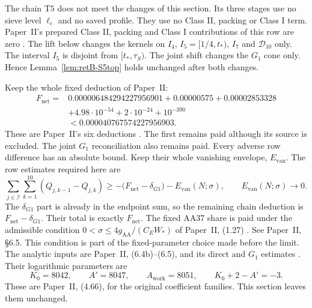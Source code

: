 The chain $\mathrm{T5}$ does not meet the changes of this section. Its
three stages use no sieve level $\ell_c$ and no saved profile. They use no
Class II, packing or Class I term. Paper~II's prepared Class II, packing and Class I
contributions of this row are zero \cite[\S2.4, paragraph ``S5-top and S6
use BV separately'']{PaperII}. The lift below changes the kernels on $I_4$,
$I_5=[1/4,t_*)$, $I_7$ and $\mathcal D_{10}$ only. The interval $I_5$ is disjoint
from $[t_*,\tau_S)$. The joint shift changes the $G_1$ cone only. Hence
Lemma~\ref{lem:retB-S5top} holds unchanged after both changes.

Keep the whole fixed deduction of Paper~II:
\begin{equation}\label{eq:retB-fixed-cost}
\begin{aligned}
 F_{\mathrm{net}}={}&0.000006484294227956901+0.00000575
                   +0.00002853328\\
                  &+4.98\cdot10^{-54}+2\cdot10^{-24}+10^{-390}\\
 &<0.000040767574227956903.
\end{aligned}
\end{equation}
These are Paper~II's six deductions \cite[(6.6)]{PaperII}.
The first remains paid although its source is excluded.
The joint $G_1$ reconciliation also remains paid.
Every adverse row difference has an absolute bound.
Keep their whole vanishing envelope, $E_{\mathrm{van}}$.
The row estimates required here are
\begin{equation}\label{eq:retB-base-errors}
 \sum_{j\in\mathcal I}\sum_{k=1}^{10}
       (Q_{j,k-1}-Q_{j,k})
 \ge-\bigl(F_{\mathrm{net}}-\delta_{G1}\bigr)
       -E_{\mathrm{van}}(N;\sigma),
 \qquad E_{\mathrm{van}}(N;\sigma)\longrightarrow0.
\end{equation}
The $\delta_{G1}$ part is already in the endpoint sum, so the remaining
chain deduction is $F_{\mathrm{net}}-\delta_{G1}$. Their total is exactly
$F_{\mathrm{net}}$.
The fixed AA37 share is paid under the admissible condition
$0<\sigma\le4g_{\mathrm{AA}}/(C_EW_*)$ of Paper~II, (1.27)
\cite{PaperII}. See Paper~II, \S6.5. This condition is part of the
fixed-parameter choice made before the limit.
The analytic inputs are Paper~II, (6.4b)--(6.5),
and its direct and $G_1$ estimates
\cite[(4.66)--(4.69), (6.4b)--(6.5)]{PaperII}.
Their logarithmic parameters are
\begin{equation}\label{eq:retB-precision}
 K_0=8042,\qquad A'=8047,\qquad A_{\mathrm{work}}=8051,
 \qquad K_0+2-A'=-3.
\end{equation}
These are Paper~II, (4.66), for the original coefficient families.
This section leaves them unchanged.

